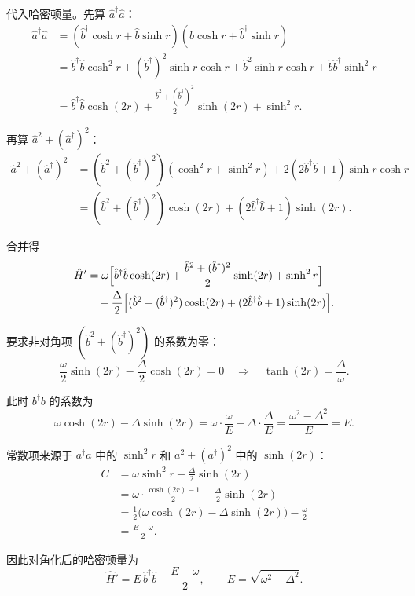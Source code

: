 代入哈密顿量。先算 $\hat{a}^\dagger\hat{a}$：
\begin{align*}
\hat{a}^\dagger\hat{a}
&= (\hat{b}^\dagger\cosh r + \hat{b}\sinh r)(\hat{b}\cosh r + \hat{b}^\dagger\sinh r) \\
&= \hat{b}^\dagger\hat{b}\cosh^2 r + (\hat{b}^\dagger)^2\sinh r\cosh r + \hat{b}^2\sinh r\cosh r + \hat{b}\hat{b}^\dagger\sinh^2 r \\
&= \hat{b}^\dagger\hat{b}\cosh(2r) + \frac{\hat{b}^2+(\hat{b}^\dagger)^2}{2}\sinh(2r) + \sinh^2 r.
\end{align*}

再算 $\hat{a}^2+(\hat{a}^\dagger)^2$：
\begin{align*}
\hat{a}^2+(\hat{a}^\dagger)^2
&= (\hat{b}^2+(\hat{b}^\dagger)^2)(\cosh^2 r+\sinh^2 r) + 2(2\hat{b}^\dagger\hat{b}+1)\sinh r\cosh r \\
&= (\hat{b}^2+(\hat{b}^\dagger)^2)\cosh(2r) + (2\hat{b}^\dagger\hat{b}+1)\sinh(2r).
\end{align*}

合并得
\begin{align*}
\hat{H}'
&= \omega\Bigl[\hat{b}^\dagger\hat{b}\cosh(2r) + \frac{\hat{b}^2+(\hat{b}^\dagger)^2}{2}\sinh(2r) + \sinh^2 r\Bigr] \\
&\quad - \frac{\Delta}{2}\Bigl[(\hat{b}^2+(\hat{b}^\dagger)^2)\cosh(2r) + (2\hat{b}^\dagger\hat{b}+1)\sinh(2r)\Bigr].
\end{align*}

要求非对角项 $(\hat{b}^2+(\hat{b}^\dagger)^2)$ 的系数为零：
\[
\frac{\omega}{2}\sinh(2r) - \frac{\Delta}{2}\cosh(2r) = 0
\quad\Longrightarrow\quad
\boxed{\tanh(2r) = \frac{\Delta}{\omega}.}
\]

此时 $b^\dagger b$ 的系数为
\[
\omega\cosh(2r) - \Delta\sinh(2r)
= \omega\cdot\frac{\omega}{E} - \Delta\cdot\frac{\Delta}{E}
= \frac{\omega^2-\Delta^2}{E} = E.
\]

常数项来源于 $a^\dagger a$ 中的 $\sinh^2 r$ 和 $a^2+(a^\dagger)^2$ 中的 $\sinh(2r)$：
\begin{align*}
C &= \omega\sinh^2 r - \frac{\Delta}{2}\sinh(2r) \\
&= \omega\cdot\frac{\cosh(2r)-1}{2} - \frac{\Delta}{2}\sinh(2r) \\
&= \frac{1}{2}\bigl(\omega\cosh(2r) - \Delta\sinh(2r)\bigr) - \frac{\omega}{2} \\
&= \frac{E-\omega}{2}.
\end{align*}

因此对角化后的哈密顿量为
\begin{equation}
\boxed{\hat{H}' = E\,\hat{b}^\dagger\hat{b} + \frac{E-\omega}{2},
\qquad E = \sqrt{\omega^2-\Delta^2}.}
\end{equation}

